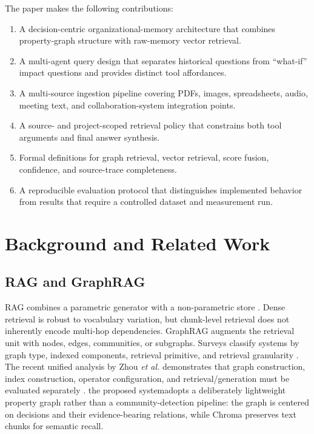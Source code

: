\documentclass[conference]{IEEEtran}
\newcommand{\system}{the proposed system}
\begin{document}
The paper makes the following contributions:
\begin{enumerate}
\item A decision-centric organizational-memory architecture that combines property-graph structure with raw-memory vector retrieval.
\item A multi-agent query design that separates historical questions from ``what-if'' impact questions and provides distinct tool affordances.
\item A multi-source ingestion pipeline covering PDFs, images, spreadsheets, audio, meeting text, and collaboration-system integration points.
\item A source- and project-scoped retrieval policy that constrains both tool arguments and final answer synthesis.
\item Formal definitions for graph retrieval, vector retrieval, score fusion, confidence, and source-trace completeness.
\item A reproducible evaluation protocol that distinguishes implemented behavior from results that require a controlled dataset and measurement run.
\end{enumerate}

\section{Background and Related Work}
\subsection{RAG and GraphRAG}
RAG combines a parametric generator with a non-parametric store \cite{lewis2020rag}. Dense retrieval is robust to vocabulary variation, but chunk-level retrieval does not inherently encode multi-hop dependencies. GraphRAG augments the retrieval unit with nodes, edges, communities, or subgraphs. Surveys classify systems by graph type, indexed components, retrieval primitive, and retrieval granularity \cite{han2025graphrag}. The recent unified analysis by Zhou \emph{et al.} demonstrates that graph construction, index construction, operator configuration, and retrieval/generation must be evaluated separately \cite{zhou2025graph}. \system adopts a deliberately lightweight property graph rather than a community-detection pipeline: the graph is centered on decisions and their evidence-bearing relations, while Chroma preserves text chunks for semantic recall.
\end{document}
